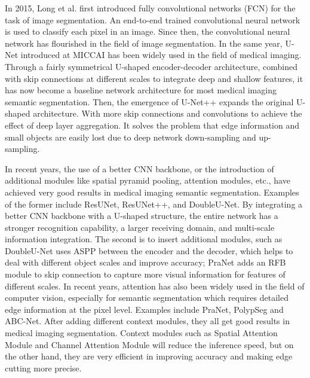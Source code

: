 \documentclass{article}
\begin{document}
\vspace{4mm}
    In 2015, Long et al. first introduced fully convolutional networks (FCN)\cite{FCN} for the task of image segmentation. 
    An end-to-end trained convolutional neural network is used to classify each pixel in an image.
    Since then, the convolutional neural network has flourished in the field of image segmentation. 
    In the same year, U-Net\cite{u-net} introduced at MICCAI has been widely used in the field of medical imaging. 
    Through a fairly symmetrical U-shaped encoder-decoder architecture, combined with skip connections at different scales to integrate deep and shallow features, it has now become a baseline network architecture for most medical imaging semantic segmentation. 
    Then, the emergence of U-Net++\cite{unet1,unet2} expands the original U-shaped architecture. 
    With more skip connections and convolutions to achieve the effect of deep layer aggregation\cite{yu2018deep}. It solves the problem that edge information and small objects are easily lost due to deep network down-sampling and up-sampling.
  
    \vspace{4mm}
    In recent years, the use of a better CNN backbone, or the introduction of additional modules like spatial pyramid pooling\cite{he2015spatial}, attention modules\cite{chen2016attention,fu2019dual}, etc., have achieved very good results in medical imaging semantic segmentation. 
    Examples of the former include ResUNet\cite{yang2019road,jha2020real}, ResUNet++\cite{jha2019resunet++}, and DoubleU-Net\cite{jha2020doubleu}. 
    By integrating a better CNN backbone with a U-shaped structure, the entire network has a stronger recognition capability, a larger receiving domain, and multi-scale information integration. 
    The second is to insert additional modules, such as DoubleU-Net\cite{jha2020doubleu} uses ASPP\cite{chen2018encoder} between the encoder and the decoder, which helps to deal with different object scales and improve accuracy; PraNet\cite{pranet} adds an RFB\cite{liu2018receptive} module to skip connection to capture more visual information for features of different scales. 
    In recent years, attention has also been widely used in the field of computer vision, especially for semantic segmentation which requires detailed edge information at the pixel level. Examples include PraNet\cite{pranet}, PolypSeg\cite{zhong2020polypseg} and ABC-Net\cite{fang2020abc}. 
    After adding different context modules, they all get good results in medical imaging segmentation. 
    Context modules such as Spatial Attention Module\cite{chen2017sca} and Channel Attention Module\cite{chen2017sca} will reduce the inference speed, but on the other hand, they are very efficient in improving accuracy and making edge cutting more precise.
\end{document}
